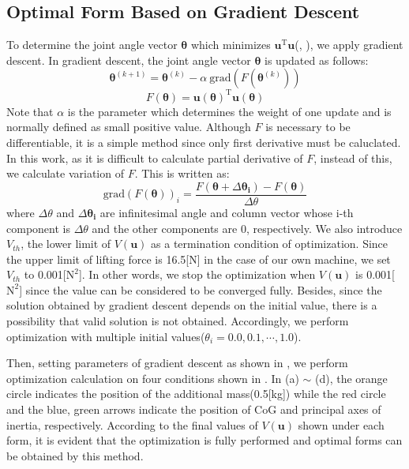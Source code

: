 \subsection{Optimal Form Based on Gradient Descent}
To determine the joint angle vector $\bm{\theta}$ which minimizes $\bm{u}^\mathrm{T}\bm{u}$(, ), we apply gradient descent. In gradient descent, the joint angle vector $\bm{\theta}$ is updated as follows:
\begin{equation}
  \bm{\theta}^{(k+1)} = \bm{\theta}^{(k)}-\alpha \ \text{grad}(F(\bm{\theta}^{(k)}))
  \label{eq:steepest_descent_method}
\end{equation}
\begin{equation*}
  F(\bm{\theta})=\bm{u}(\bm{\theta})^\mathrm{T}\bm{u}(\bm{\theta})
\end{equation*}
Note that $\alpha$ is the parameter which determines the weight of one update and is normally defined as small positive value. Although $F$ is necessary to be differentiable, it is a simple method since only first derivative must be caluclated. In this work, as it is difficult to calculate partial derivative of $F$, instead of this, we calculate variation of $F$. This is written as:
\begin{equation}
  \text{grad}(F(\bm{\theta}))_i=\frac{F(\bm{\theta}+\Delta \bm{\theta_i})-F(\bm{\theta})}{\Delta \theta}
  \label{eq:grad}
\end{equation}
where $\Delta \theta$ and $\Delta \bm{\theta_i}$ are infinitesimal angle and column vector whose i-th component is $\Delta \theta$ and the other components are 0, respectively. We also introduce $V_{th}$, the lower limit of $V(\bm{u})$ as a termination condition of optimization. Since the upper limit of lifting force is 16.5[N] in the case of our own machine, we set $V_{th}$ to 0.001[$\text{N}^2$]. In other words, we stop the optimization when $V(\bm{u})$ is 0.001[$\text{N}^2$] since the value can be considered to be converged fully. Besides, since the solution obtained by gradient descent depends on the initial value, there is a possibility that valid solution is not obtained. Accordingly, we perform optimization with multiple initial values($\theta_i = 0.0, 0.1, \cdots, 1.0$). 
\par
Then, setting parameters of gradient descent as shown in , we perform optimization calculation on four conditions shown in . In (a) $\sim$ (d), the orange circle indicates the position of the additional mass(0.5[kg]) while the red circle and the blue, green arrows indicate the position of CoG and principal axes of inertia, respectively. According to the final values of $V(\bm{u})$ shown under each form, it is evident that the optimization is fully performed and optimal forms can be obtained by this method.

